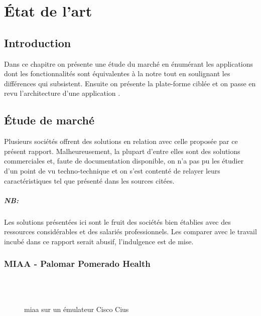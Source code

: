 
\chapter{État de l'art}
\section{Introduction}

Dans ce chapitre on présente une étude du marché en énumérant les
applications dont les fonctionnalités sont équivalentes à la notre tout
en soulignant les différences qui subsistent. Ensuite on présente la
plate-forme ciblée et on passe en revu l’architecture d’une application
\android{}.

\section{Étude de marché}

Plusieurs sociétés offrent des solutions en relation avec celle proposée
par ce présent rapport. Malheureusement, la plupart d’entre elles sont
des solutions commerciales et, faute de documentation disponible, on n’a
pas pu les étudier d’un point de vu techno-technique et on s’est
contenté de relayer leurs caractéristiques tel que présenté dans les
sources citées.

\paragraph{NB:} %
\label{par:nb}

Les solutions présentées ici sont le fruit des sociétés bien établies avec des ressources considérables et des salariés professionnels. Les comparer avec le travail incubé dans ce rapport serait abusif, l’indulgence est de mise.

\subsection{MIAA - Palomar Pomerado Health}

\begin{figure}
\centering
{}\\
\\
\caption{\gls{miaa} sur un émulateur Cisco Cius}
\label{fig:miaa}
\end{figure}

